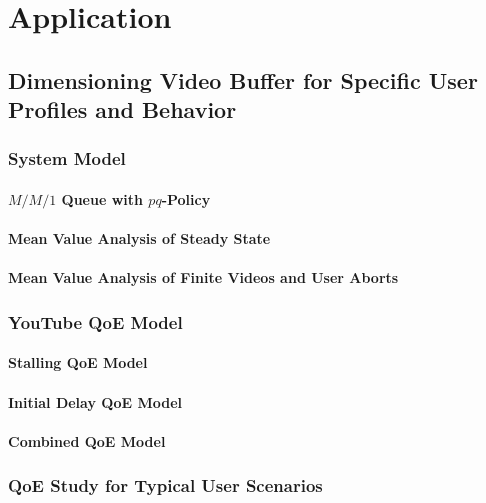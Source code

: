 \chapter{Application}\label{chap:application}




\section{Dimensioning Video Buffer for Specific User Profiles and Behavior}
\cite{Hossfeld2015}

\subsection{System Model}
\subsubsection*{\(M/M/1\) Queue with \(pq\)-Policy}
\subsubsection*{Mean Value Analysis of Steady State}
\subsubsection*{Mean Value Analysis of Finite Videos and User Aborts}

\subsection{YouTube QoE Model}
\subsubsection*{Stalling QoE Model}
\subsubsection*{Initial Delay QoE Model}
\subsubsection*{Combined QoE Model}

\subsection{QoE Study for Typical User Scenarios}
